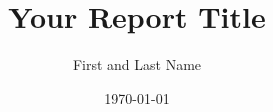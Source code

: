 \documentclass[10pt,a4paper]{article}
\begin{document}
\title{Your Report Title} %
\author{First and Last Name}
\date{\today} %
\maketitle %




\begin{abstract}
\normalsize
\lipsum[9]

\end{abstract}

\setcounter{tocdepth}{2}
\tableofcontents


\clearpage








\clearpage



\clearpage
{}

\end{document}
